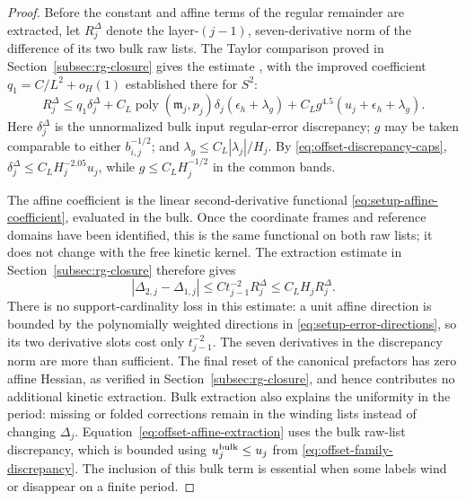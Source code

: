 \begin{proof}
Before the constant and affine terms of the regular remainder are
extracted, let $R_j^\Delta$ denote the layer-$(j-1)$, seven-derivative
norm of the difference of its two bulk raw lists.  The Taylor comparison proved in
Section~\ref{subsec:rg-closure} gives the estimate
\cite[Equation~(5.39)]{OpenAI-O4}, with the improved coefficient
$q_1=C/L^2+o_H(1)$ established there for $S^2$:
\begin{equation}
 R_j^\Delta\le q_1\delta_j^\Delta
   +C_L\operatorname{poly}(\mathfrak m_j,p_j)\delta_j
                      (\epsilon_h+\lambda_g)
   +C_Lg^{4.5}(u_j+\epsilon_h+\lambda_g).
 \label{eq:offset-raw-discrepancy}
\end{equation}
Here $\delta_j^\Delta$ is the unnormalized bulk input regular-error
discrepancy; $g$ may be taken comparable to either $b_{i,j}^{-1/2}$;
and $\lambda_g\le C_L|\lambda_j|/H_j$.  By
\eqref{eq:offset-discrepancy-caps},
$\delta_j^\Delta\le C_LH_j^{-2.05}u_j$, while
$g\le C_LH_j^{-1/2}$ in the common bands.

The affine coefficient is the linear second-derivative functional
\eqref{eq:setup-affine-coefficient}, evaluated in the bulk.  Once
the coordinate frames and reference domains have been identified,
this is the same functional on both raw lists; it does not change
with the free kinetic kernel.  The extraction estimate in
Section~\ref{subsec:rg-closure} therefore gives
\begin{equation}
 |\Delta_{2,j}-\Delta_{1,j}|
       \le C t_{j-1}^{-2}R_j^\Delta
       \le C_L H_j R_j^\Delta.
 \label{eq:offset-affine-extraction}
\end{equation}
There is no support-cardinality loss in this estimate: a unit affine
direction is bounded by the polynomially weighted directions in
\eqref{eq:setup-error-directions}, so its two derivative slots cost
only $t_{j-1}^{-2}$.  The seven derivatives in the discrepancy norm
are more than sufficient.  The final reset of the canonical
prefactors has zero affine Hessian, as verified in
Section~\ref{subsec:rg-closure}, and hence contributes no additional
kinetic extraction.  Bulk extraction also explains the uniformity
in the period: missing or folded corrections remain in the winding
lists instead of changing $\Delta_j$.  Equation~\eqref{eq:offset-affine-extraction}
uses the bulk raw-list discrepancy, which is bounded using
$u_j^{\rm bulk}\le u_j$ from
\eqref{eq:offset-family-discrepancy}.  The inclusion of this bulk
term is essential when some labels wind or disappear on a finite period.


\end{proof}
